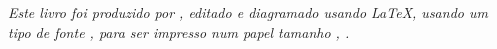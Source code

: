 \cleardoublepage

\null
\vfill
\newpage

\null
\vfill
\thispagestyle{empty}


{\normalsize \it Este livro foi produzido por \myauthor, editado e diagramado usando \LaTeX,
usando um tipo de fonte \showfont,
para ser impresso num papel tamanho \ImprimirTamanhoPapel,  \imprimirdata.
\vspace*{4pt}}






